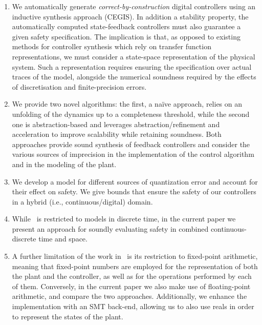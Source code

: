 \documentclass[twocolumn]{autart}    %
\renewcommand{\note}[1]{\textcolor{red}{[#1]}}
\begin{document}
\begin{enumerate}

\item We automatically generate \emph{correct-by-construction} digital
  controllers using an inductive synthesis approach (CEGIS).  
  In addition a stability property, the automatically computed state-feedback
  controllers must also guarantee a given safety specification.
  The implication is that, as opposed to existing
  methods for controller synthesis which rely on transfer function
  representations, we must consider a state-space representation of
  the physical system. Such a representation requires ensuring the
  specification over actual traces of the model, alongside the
  numerical soundness required by the effects of discretisation and
  finite-precision errors.

  
\item We provide two novel algorithms: the first, a na\"ive approach, relies on 
  an unfolding of the dynamics up to a completeness threshold, while the
  second one is abstraction-based and leverages abstraction/refinement and
  acceleration to improve scalability while retaining soundness.  %
  Both approaches provide sound synthesis of 
  feedback controllers and consider the various sources of imprecision in
  the implementation of the control algorithm and in the modeling of the
  plant. 
%
\item We develop a model for different sources of quantization error and account for 
  their effect on safety.  We give bounds that ensure the
  safety of our controllers in a hybrid (i.e., continuous/digital) domain.

\item While~\cite{DBLP:conf/cav/AbateBCCDKKP17} is restricted to models in discrete time, in the current paper we present an approach for
  soundly evaluating safety in combined continuous-discrete time and space. 

\item A further limitation of the work in~\cite{DBLP:conf/cav/AbateBCCDKKP17} 
  is its restriction to fixed-point arithmetic, meaning that fixed-point
  numbers are employed for the representation of both the plant and the
  controller, as well as for the operations performed by each of them. 
  Conversely, in the current paper we also make use of floating-point
  arithmetic, and compare the two approaches.  Additionally, we enhance the
  implementation with an SMT back-end, allowing us to also use reals in order
  to represent the states of the plant. 

\end{enumerate}
  
\end{document}
